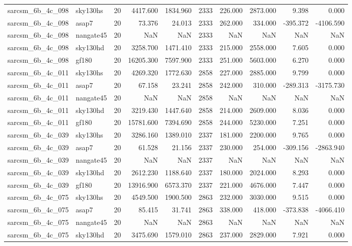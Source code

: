 \begin{longtable}{llrrrrrrrr}
sarcsm\_6b\_4c\_098 & sky130hs & 20 & 4417.600 & 1834.960 & 2333 & 226.000 & 2873.000 & 9.398 & 0.000 \\
sarcsm\_6b\_4c\_098 & asap7 & 20 & 73.376 & 24.013 & 2333 & 262.000 & 334.000 & -395.372 & -4106.590 \\
sarcsm\_6b\_4c\_098 & nangate45 & 20 & NaN & NaN & 2333 & NaN & NaN & NaN & NaN \\
sarcsm\_6b\_4c\_098 & sky130hd & 20 & 3258.700 & 1471.410 & 2333 & 215.000 & 2558.000 & 7.605 & 0.000 \\
sarcsm\_6b\_4c\_098 & gf180 & 20 & 16205.300 & 7597.900 & 2333 & 251.000 & 5603.000 & 6.270 & 0.000 \\
sarcsm\_6b\_4c\_011 & sky130hs & 20 & 4269.320 & 1772.630 & 2858 & 227.000 & 2885.000 & 9.799 & 0.000 \\
sarcsm\_6b\_4c\_011 & asap7 & 20 & 67.158 & 23.241 & 2858 & 242.000 & 310.000 & -289.313 & -3175.730 \\
sarcsm\_6b\_4c\_011 & nangate45 & 20 & NaN & NaN & 2858 & NaN & NaN & NaN & NaN \\
sarcsm\_6b\_4c\_011 & sky130hd & 20 & 3219.430 & 1447.640 & 2858 & 214.000 & 2609.000 & 8.036 & 0.000 \\
sarcsm\_6b\_4c\_011 & gf180 & 20 & 15781.600 & 7394.690 & 2858 & 244.000 & 5230.000 & 7.251 & 0.000 \\
sarcsm\_6b\_4c\_039 & sky130hs & 20 & 3286.160 & 1389.010 & 2337 & 181.000 & 2200.000 & 9.765 & 0.000 \\
sarcsm\_6b\_4c\_039 & asap7 & 20 & 61.528 & 21.156 & 2337 & 230.000 & 254.000 & -309.156 & -2863.940 \\
sarcsm\_6b\_4c\_039 & nangate45 & 20 & NaN & NaN & 2337 & NaN & NaN & NaN & NaN \\
sarcsm\_6b\_4c\_039 & sky130hd & 20 & 2612.230 & 1188.640 & 2337 & 180.000 & 2024.000 & 8.293 & 0.000 \\
sarcsm\_6b\_4c\_039 & gf180 & 20 & 13916.900 & 6573.370 & 2337 & 221.000 & 4676.000 & 7.447 & 0.000 \\
sarcsm\_6b\_4c\_075 & sky130hs & 20 & 4549.500 & 1900.500 & 2863 & 232.000 & 3030.000 & 9.515 & 0.000 \\
sarcsm\_6b\_4c\_075 & asap7 & 20 & 85.415 & 31.741 & 2863 & 338.000 & 418.000 & -373.838 & -4066.410 \\
sarcsm\_6b\_4c\_075 & nangate45 & 20 & NaN & NaN & 2863 & NaN & NaN & NaN & NaN \\
sarcsm\_6b\_4c\_075 & sky130hd & 20 & 3475.690 & 1579.010 & 2863 & 237.000 & 2829.000 & 7.921 & 0.000 \\

\end{longtable}
